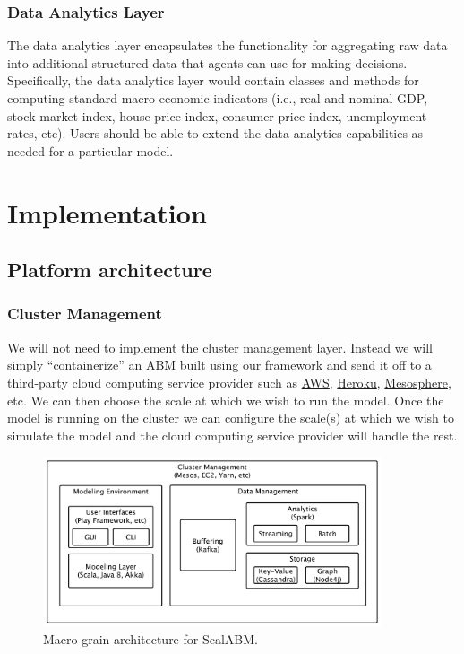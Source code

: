 \documentclass[11pt]{amsart}
\begin{document}
\subsubsection{Data Analytics Layer}
The data analytics layer encapsulates the functionality for aggregating raw data into additional structured data that agents can use for making decisions.  Specifically, the data analytics layer would contain classes and methods for computing standard macro economic indicators (i.e., real and nominal GDP, stock market index, house price index, consumer price index, unemployment rates, etc). Users should be able to extend the data analytics capabilities as needed for a particular model.

\section{Implementation}

\subsection{Platform architecture}

\subsubsection{Cluster Management}
We will not need to implement the cluster management layer.  Instead we will simply ``containerize'' an ABM built using our framework and send it off to a third-party cloud computing service provider such as \href{http://aws.amazon.com/}{AWS}, \href{https://www.heroku.com/}{Heroku}, \href{https://mesosphere.com/}{Mesosphere}, etc.  We can then choose the scale at which we wish to run the model. Once the model is running on the cluster we can configure the scale(s) at which we wish to simulate the model and the cloud computing service provider will handle the rest.

\begin{figure}[H]
\centering
\includegraphics[width=10cm]{img/coarse-grain-schema-2.pdf}
\caption{Macro-grain architecture for ScalABM. }
\end{figure}
\end{document}
